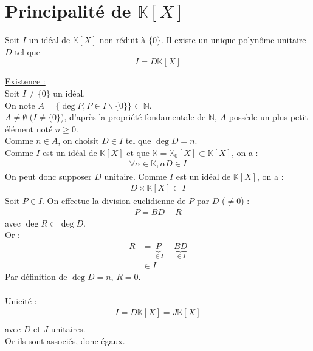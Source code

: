 \documentclass[../main.tex]{subfiles}
\begin{document}
\setcounter{section}{14}
\section{Principalité de $\mathbb{K}[X]$}
\begin{tcolorbox}[title=Théorème 16.15, title filled=false, colframe=orange, colback=orange!10!white]
    Soit $I$ un idéal de $\mathbb{K}[X]$ non réduit à $\{0\}$. Il existe un unique polynôme unitaire $D$ tel que
    $$I = D \mathbb{K}[X]$$
\end{tcolorbox}

\noindent \underline{Existence :} \\
Soit $I \neq \{0\}$ un idéal. \\
On note $A = \{ \deg P, P \in I\backslash \{0\} \} \subset \mathbb{N}$. \\
$A \neq \emptyset$ ($I \neq \{0\}$), d'après la propriété fondamentale de $\mathbb{N}$, $A$ possède un plus petit élément noté $n \geq 0$. \\
Comme $n \in A$, on choisit $D \in I$ tel que $\deg D = n$. \\
Comme $I$ est un idéal de $\mathbb{K}[X]$ et que $\mathbb{K} = \mathbb{K}_0[X] \subset \mathbb{K}[X]$, on a : 
\begin{align*}
    \forall \alpha \in \mathbb{K}, \alpha D \in I
\end{align*}
On peut donc supposer $D$ unitaire. 
Comme $I$ est un idéal de $\mathbb{K}[X]$, on a : 
\begin{align*}
    D \times \mathbb{K}[X] \subset I
\end{align*}
Soit $P \in I$. On effectue la division euclidienne de $P$ par $D$ ($\neq 0$) : 
\begin{align*}
    P = BD + R
\end{align*}
avec $\deg R \subset \deg D$. \\
Or : 
\begin{align*}
    R &= \underbrace{P}_{\in I} - \underbrace{BD}_{\in I} \\
    &\in I
\end{align*}
Par définition de $\deg D = n$, $R = 0$. \\ \\

\noindent \underline{Unicité :} \\
\begin{align*}
    I = D \mathbb{K}[X] = J \mathbb{K}[X] \\
\end{align*}
avec $D$ et $J$ unitaires. \\
Or ils sont associés, donc égaux. 
\end{document}
